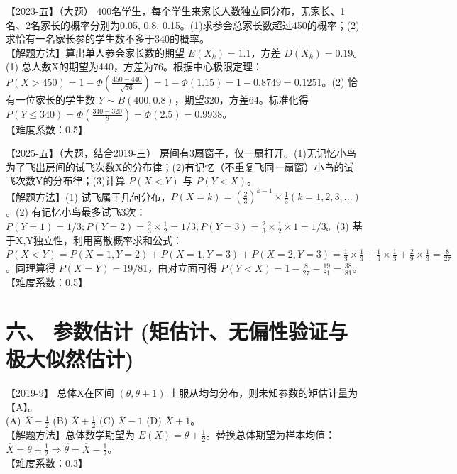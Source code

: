 \documentclass[zihao=4, a4paper, fontset=mac]{ctexart}
\begin{document}
\par\vspace{\baselineskip}

【2023-五】（大题） 400名学生，每个学生来家长人数独立同分布，无家长、1名、2名家长的概率分别为0.05, 0.8, 0.15。(1)求参会总家长数超过450的概率；(2)求恰有一名家长参的学生数不多于340的概率。\\
【解题方法】算出单人参会家长数的期望 $E(X_k)=1.1$，方差 $D(X_k)=0.19$。(1) 总人数X的期望为440，方差为76。根据中心极限定理：$P(X>450) = 1-\Phi(\frac{450-440}{\sqrt{76}}) = 1-\Phi(1.15) = 1-0.8749=0.1251$。(2) 恰有一位家长的学生数 $Y\sim B(400, 0.8)$，期望320，方差64。标准化得 $P(Y\le340) = \Phi(\frac{340-320}{8}) = \Phi(2.5)=0.9938$。\\
【难度系数：0.5】

\par\vspace{\baselineskip}

【2025-五】（大题，结合2019-三） 房间有3扇窗子，仅一扇打开。(1)无记忆小鸟为了飞出房间的试飞次数X的分布律；(2)有记忆（不重复飞同一扇窗）小鸟的试飞次数Y的分布律；(3)计算 $P(X<Y)$ 与 $P(Y<X)$。\\
【解题方法】(1) 试飞属于几何分布，$P(X=k) = (\frac{2}{3})^{k-1}\times\frac{1}{3} (k=1,2,3,...)$。(2) 有记忆小鸟最多试飞3次：$P(Y=1)=1/3; P(Y=2)=\frac{2}{3}\times\frac{1}{2}=1/3; P(Y=3)=\frac{2}{3}\times\frac{1}{2}\times1=1/3$。(3) 基于X,Y独立性，利用离散概率求和公式：$P(X<Y) = P(X=1,Y=2)+P(X=1,Y=3)+P(X=2,Y=3) = \frac{1}{3}\times\frac{1}{3}+\frac{1}{3}\times\frac{1}{3}+\frac{2}{9}\times\frac{1}{3} = \frac{8}{27}$。同理算得 $P(X=Y)=19/81$，由对立面可得 $P(Y<X) = 1 - \frac{8}{27} - \frac{19}{81} = \frac{38}{81}$。\\
【难度系数：0.5】


\section*{六、 参数估计 (矩估计、无偏性验证与极大似然估计)}

【2019-9】 总体X在区间 $(\theta,\theta+1)$ 上服从均匀分布，则未知参数的矩估计量为【A】。\\
(A) $\overline{X}-\frac{1}{2}$ \quad (B) $\overline{X}+\frac{1}{2}$ \quad (C) $\overline{X}-1$ \quad (D) $\overline{X}+1$。\\
【解题方法】总体数学期望为 $E(X) = \theta + \frac{1}{2}$。替换总体期望为样本均值：$\overline{X} = \theta + \frac{1}{2} \Rightarrow \widehat{\theta} = \overline{X} - \frac{1}{2}$。\\
【难度系数：0.3】
\end{document}
